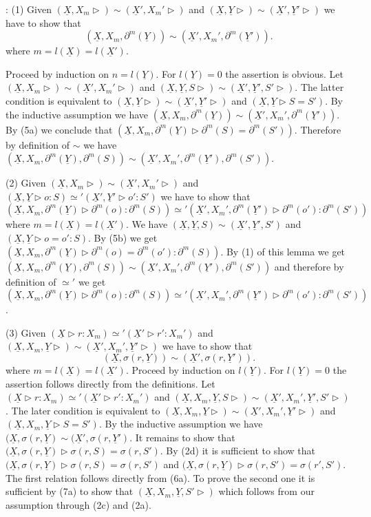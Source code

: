 \documentclass[11pt]{article}
\newenvironment{proof}{{\bf Proof}:}{\vskip 5mm }
\newcommand{\uu}{\underline}
\begin{document}
\begin{proof}
(1) Given $(\uu{X},X_m\rhd)\sim(\uu{X}',X_m'\rhd)$ and $(\uu{X},\uu{Y}\rhd)\sim(\uu{X}',\uu{Y}'\rhd)$ we have to show that 
%
$$(\uu{X},X_m,\partial^m(\uu{Y}))\sim (\uu{X}',X_m',\partial^m(\uu{Y}')).$$
%
where $m=l(\uu{X})=l(\uu{X}')$.

Proceed by induction on $n=l(\uu{Y})$. For $l(\uu{Y})=0$ the assertion is obvious. Let  $(\uu{X},X_m\rhd)\sim(\uu{X}',X_m'\rhd)$ and $(\uu{X},\uu{Y},S\rhd)\sim(\uu{X}',\uu{Y}',S'\rhd)$. The latter condition is equivalent to $(\uu{X},\uu{Y}\rhd)\sim(\uu{X}',\uu{Y}'\rhd)$  and $(\uu{X},\uu{Y}\rhd S=S')$. By the inductive assumption we have $(\uu{X},X_m,\partial^m(\uu{Y}))\sim (\uu{X}',X_m',\partial^m(\uu{Y}'))$. By (5a) we conclude that $(\uu{X},X_m,\partial^m(\uu{Y})\rhd \partial^m(S)=\partial^m(S'))$. Therefore by definition of $\sim$ we have $(\uu{X},X_m,\partial^m(\uu{Y}),\partial^m(S))\sim(\uu{X}',X_m',\partial^m(\uu{Y}'), \partial^m(S'))$.

(2) Given $(\uu{X},X_m\rhd)\sim(\uu{X}',X_m'\rhd)$ and $(\uu{X},\uu{Y}\rhd o:S)\simeq'(\uu{X}',\uu{Y}'\rhd o':S')$ we have to show that $(\uu{X},X_m,\partial^m(\uu{Y})\rhd \partial^m(o):\partial^m(S))\simeq' (\uu{X}',X_m',\partial^m(\uu{Y}')\rhd \partial^m(o'):\partial^m(S'))$ where $m=l(\uu{X})=l(\uu{X}')$. We have $(\uu{X},\uu{Y},S)\sim(\uu{X}',\uu{Y}',S')$ and $(\uu{X},\uu{Y}\rhd o=o':S)$. By (5b) we get $(\uu{X},X_m, \partial^m(\uu{Y})\rhd \partial^m(o)=\partial^m(o'):\partial^m(S))$. By (1) of this lemma we get $(\uu{X},X_m,\partial^m(\uu{Y}),\partial^m(S))\sim(\uu{X}',X_m',\partial^m(\uu{Y}'),\partial^m(S'))$ and therefore by definition of $\simeq'$ we get $(\uu{X},X_m,\partial^m(\uu{Y})\rhd \partial^m(o):\partial^m(S))\simeq' (\uu{X}',X_m',\partial^m(\uu{Y}')\rhd \partial^m(o'):\partial^m(S'))$.

(3) Given $(\uu{X}\rhd r:X_m)\simeq'(\uu{X}'\rhd r':X_m')$ and $(\uu{X},X_m,\uu{Y}\rhd)\sim(\uu{X}',X_m',\uu{Y}'\rhd)$ we have to show that 
%
$$(\uu{X},\sigma(r,\uu{Y}))\sim(\uu{X}',\sigma(r,\uu{Y}')).$$
%
where $m=l(\uu{X})=l(\uu{X}')$. Proceed by induction on $l(\uu{Y})$. For $l(\uu{Y})=0$ the assertion follows directly from the definitions. Let $(\uu{X}\rhd r:X_m)\simeq'(\uu{X}'\rhd r':X_m')$ and $(\uu{X},X_m,\uu{Y},S\rhd)\sim(\uu{X}',X_m',\uu{Y}',S'\rhd)$. The later condition is equivalent to $(\uu{X},X_m,\uu{Y}\rhd)\sim(\uu{X}',X_m',\uu{Y}'\rhd)$  and $(\uu{X},X_m,\uu{Y}\rhd S=S')$. By the inductive assumption we have $(\uu{X},\sigma(r,\uu{Y})\sim(\uu{X}',\sigma(r,\uu{Y}')$. It remains to show that $(\uu{X},\sigma(r,\uu{Y})\rhd \sigma(r,S)=\sigma(r,S')$. By (2d) it is sufficient to show that $(\uu{X},\sigma(r,\uu{Y})\rhd \sigma(r,S)=\sigma(r,S')$ and $(\uu{X},\sigma(r,\uu{Y})\rhd \sigma(r,S')=\sigma(r',S')$. The first relation follows directly from (6a). To prove the second one it is sufficient by (7a) to show that $(\uu{X},X_m,\uu{Y},S'\rhd)$ which follows from our assumption through (2c) and (2a). 


\end{proof}
\end{document}
